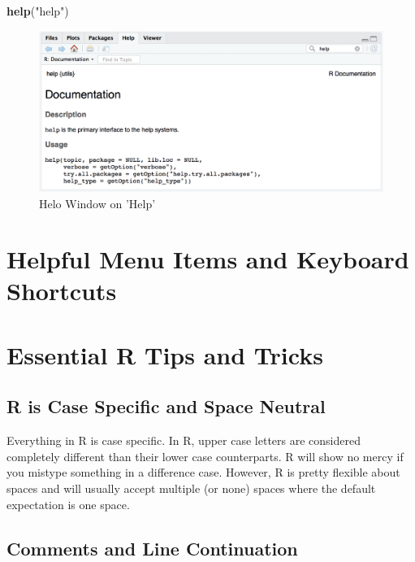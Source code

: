 \documentclass[]{krantz}
\makeatletter
\newenvironment{Shaded}{\begin{snugshade}}{\end{snugshade}}
\newcommand{\KeywordTok}[1]{\textcolor[rgb]{0.27,0.27,0.27}{\textbf{#1}}}
\newcommand{\StringTok}[1]{\textcolor[rgb]{0.5,0.5,0.5}{#1}}
\newcommand{\NormalTok}[1]{#1}
\newenvironment{kframe}{%
\medskip{}
\setlength{\fboxsep}{.8em}
 \def\at@end@of@kframe{}%
 \ifinner\ifhmode%
  \def\at@end@of@kframe{\end{minipage}}%
  \begin{minipage}{\columnwidth}%
 \fi\fi%
 \def\FrameCommand##1{\hskip\@totalleftmargin \hskip-\fboxsep
 \colorbox{shadecolor}{##1}\hskip-\fboxsep
     \hskip-\linewidth \hskip-\@totalleftmargin \hskip\columnwidth}%
 \MakeFramed {\advance\hsize-\width
   \@totalleftmargin\z@ \linewidth\hsize
   \@setminipage}}%
 {\par\unskip\endMakeFramed%
 \at@end@of@kframe}
\renewenvironment{Shaded}{\begin{kframe}}{\end{kframe}}
\theoremstyle{definition}
\theoremstyle{definition}
\theoremstyle{definition}
\theoremstyle{remark}
\makeatother
\begin{document}
\begin{Shaded}
\begin{Highlighting}[]
\KeywordTok{help}\NormalTok{(}\StringTok{"help"}\NormalTok{)}
\end{Highlighting}
\end{Shaded}

\begin{figure}

{\centering \includegraphics[width=0.8\linewidth]{images/help} 

}

\caption{Helo Window on 'Help'}\label{fig:unnamed-chunk-9}
\end{figure}

\section{Helpful Menu Items and Keyboard
Shortcuts}\label{helpful-menu-items-and-keyboard-shortcuts}

\section{Essential R Tips and Tricks}\label{essential-r-tips-and-tricks}

\subsection{R is Case Specific and Space
Neutral}\label{r-is-case-specific-and-space-neutral}

Everything in R is case specific. In R, upper case letters are
considered completely different than their lower case counterparts. R
will show no mercy if you mistype something in a difference case.
However, R is pretty flexible about spaces and will usually accept
multiple (or none) spaces where the default expectation is one space.

\subsection{Comments and Line
Continuation}\label{comments-and-line-continuation}
\end{document}
